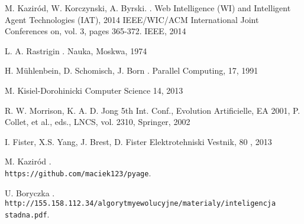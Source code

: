\begin{thebibliography}{1}
M. Kaziród, W. Korczynski, A. Byrski.
.
\newblock  Web Intelligence (WI) and Intelligent Agent Technologies (IAT), 2014 IEEE/WIC/ACM International Joint Conferences on, vol. 3, pages 365-372. IEEE, 2014


L. A. Rastrigin
.
\newblock Nauka, Moskwa, 1974


 H. Mühlenbein, D. Schomisch, J. Born
.
\newblock Parallel Computing, 17, 1991


M. Kisiel-Dorohinicki
\newblock Computer Science 14, 2013


R. W. Morrison, K. A. D. Jong 
\newblock 5th Int. Conf., Evolution Artificielle, EA 2001, P. Collet, et al., eds., LNCS, vol. 2310, Springer, 2002


I. Fister, X.S. Yang, J. Brest, D. Fister
\newblock Elektrotehniski Vestnik, 80 , 2013

M. Kaziród
.
\newblock \\\texttt{https://github.com/maciek123/pyage}.

U. Boryczka
.
\newblock \\\texttt{http://155.158.112.34/algorytmyewolucyjne/materialy/inteligencja stadna.pdf}.

\end{thebibliography}

